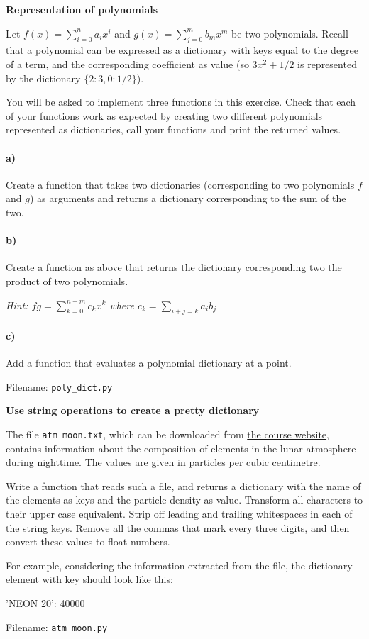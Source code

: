 \begin{Problem}{\textbf{Representation of polynomials}} \label{prob62}

\noindent Let $f(x)=\sum_{i=0}^n a_ix^i$ and $g(x)=\sum_{j=0}^mb_mx^m$ be two polynomials.
Recall that a polynomial can be expressed as a dictionary with keys equal to the
degree of a term, and the corresponding coefficient as value (so $3x^2+1/2$ is represented
by the dictionary $\{2: 3, 0: 1/2\}$).

You will be asked to implement three functions in this exercise. Check that each of your functions work as expected by creating two different polynomials represented as dictionaries, call your functions and print the returned values.

\paragraph{a)}
Create a function that takes two dictionaries (corresponding to two polynomials
$f$ and $g$) as arguments and returns a dictionary corresponding to the sum of the two.

\paragraph{b)}
Create a function as above that returns the dictionary corresponding two the
product of two polynomials.

\emph{Hint: $fg=\sum_{k=0}^{n+m} c_kx^k$ where $c_k=\sum_{i+j=k}a_ib_j$}

\paragraph{c)}
Add a function that evaluates a polynomial dictionary at a point.

Filename: \texttt{poly\_dict.py}
\end{Problem}

\begin{Problem} \textbf{Use string operations to create a pretty dictionary}

\noindent
The file \texttt{atm\_moon.txt}, which can be downloaded from \href{\dataurl}{the course website},
contains information about the composition of elements in the lunar atmosphere
during nighttime. The values are given in particles per cubic centimetre.

Write a function that reads such a file, and returns a dictionary with the name of
the elements as keys and the particle density as value. Transform all characters to
their upper case equivalent. Strip off leading and trailing whitespaces in each of
the string keys. Remove all the commas that mark every three digits, and then
convert these values to float numbers.

For example, considering the information  extracted from the file,
the dictionary element with key  should look like this:
\begin{python}
'NEON 20': 40000
\end{python}

Filename: \texttt{atm\_moon.py}
\end{Problem}

